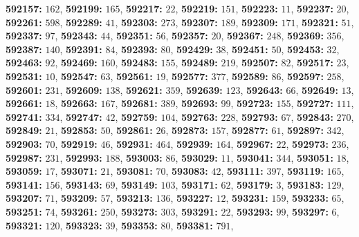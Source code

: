 \textsf{\bfseries 592157:} $162$, \textsf{\bfseries 592199:} $165$, \textsf{\bfseries 592217:} $22$, \textsf{\bfseries 592219:} $151$, \textsf{\bfseries 592223:} $11$, \textsf{\bfseries 592237:} $20$, \textsf{\bfseries 592261:} $598$, \textsf{\bfseries 592289:} $41$, \textsf{\bfseries 592303:} $273$, \textsf{\bfseries 592307:} $189$, \textsf{\bfseries 592309:} $171$, \textsf{\bfseries 592321:} $51$, \textsf{\bfseries 592337:} $97$, \textsf{\bfseries 592343:} $44$, \textsf{\bfseries 592351:} $56$, \textsf{\bfseries 592357:} $20$, \textsf{\bfseries 592367:} $248$, \textsf{\bfseries 592369:} $356$, \textsf{\bfseries 592387:} $140$, \textsf{\bfseries 592391:} $84$, \textsf{\bfseries 592393:} $80$, \textsf{\bfseries 592429:} $38$, \textsf{\bfseries 592451:} $50$, \textsf{\bfseries 592453:} $32$, \textsf{\bfseries 592463:} $92$, \textsf{\bfseries 592469:} $160$, \textsf{\bfseries 592483:} $155$, \textsf{\bfseries 592489:} $219$, \textsf{\bfseries 592507:} $82$, \textsf{\bfseries 592517:} $23$, \textsf{\bfseries 592531:} $10$, \textsf{\bfseries 592547:} $63$, \textsf{\bfseries 592561:} $19$, \textsf{\bfseries 592577:} $377$, \textsf{\bfseries 592589:} $86$, \textsf{\bfseries 592597:} $258$, \textsf{\bfseries 592601:} $231$, \textsf{\bfseries 592609:} $138$, \textsf{\bfseries 592621:} $359$, \textsf{\bfseries 592639:} $123$, \textsf{\bfseries 592643:} $66$, \textsf{\bfseries 592649:} $13$, \textsf{\bfseries 592661:} $18$, \textsf{\bfseries 592663:} $167$, \textsf{\bfseries 592681:} $389$, \textsf{\bfseries 592693:} $99$, \textsf{\bfseries 592723:} $155$, \textsf{\bfseries 592727:} $111$, \textsf{\bfseries 592741:} $334$, \textsf{\bfseries 592747:} $42$, \textsf{\bfseries 592759:} $104$, \textsf{\bfseries 592763:} $228$, \textsf{\bfseries 592793:} $67$, \textsf{\bfseries 592843:} $270$, \textsf{\bfseries 592849:} $21$, \textsf{\bfseries 592853:} $50$, \textsf{\bfseries 592861:} $26$, \textsf{\bfseries 592873:} $157$, \textsf{\bfseries 592877:} $61$, \textsf{\bfseries 592897:} $342$, \textsf{\bfseries 592903:} $70$, \textsf{\bfseries 592919:} $46$, \textsf{\bfseries 592931:} $464$, \textsf{\bfseries 592939:} $164$, \textsf{\bfseries 592967:} $22$, \textsf{\bfseries 592973:} $236$, \textsf{\bfseries 592987:} $231$, \textsf{\bfseries 592993:} $188$, \textsf{\bfseries 593003:} $86$, \textsf{\bfseries 593029:} $11$, \textsf{\bfseries 593041:} $344$, \textsf{\bfseries 593051:} $18$, \textsf{\bfseries 593059:} $17$, \textsf{\bfseries 593071:} $21$, \textsf{\bfseries 593081:} $70$, \textsf{\bfseries 593083:} $42$, \textsf{\bfseries 593111:} $397$, \textsf{\bfseries 593119:} $165$, \textsf{\bfseries 593141:} $156$, \textsf{\bfseries 593143:} $69$, \textsf{\bfseries 593149:} $103$, \textsf{\bfseries 593171:} $62$, \textsf{\bfseries 593179:} $3$, \textsf{\bfseries 593183:} $129$, \textsf{\bfseries 593207:} $71$, \textsf{\bfseries 593209:} $57$, \textsf{\bfseries 593213:} $136$, \textsf{\bfseries 593227:} $12$, \textsf{\bfseries 593231:} $159$, \textsf{\bfseries 593233:} $65$, \textsf{\bfseries 593251:} $74$, \textsf{\bfseries 593261:} $250$, \textsf{\bfseries 593273:} $303$, \textsf{\bfseries 593291:} $22$, \textsf{\bfseries 593293:} $99$, \textsf{\bfseries 593297:} $6$, \textsf{\bfseries 593321:} $120$, \textsf{\bfseries 593323:} $39$, \textsf{\bfseries 593353:} $80$, \textsf{\bfseries 593381:} $791$, 
